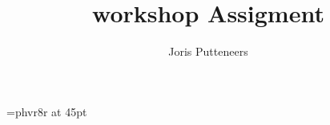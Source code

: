 

\font\myfont=phvr8r at 45pt
\title{{\myfont workshop Assigment}}
\author{Joris Putteneers}
\date{}

\pagestyle{mypagestyle}


\maketitle


\newpage

%



